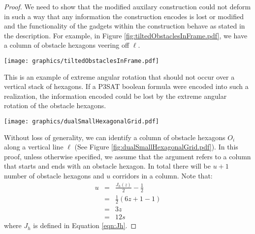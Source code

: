 \documentclass[10pt]{CSUNthesis}
\theoremstyle{plain}%
\theoremstyle{definition}
\theoremstyle{remark}
\newcommand{\lr}[1]{\left( #1 \right)}
\begin{document}
\begin{proof}
We need to show that the modified auxilary construction could not deform in such a way that any information the construction encodes is lost or modified and the functionality of the gadgets within the construction behave as stated in the description. 
For example, in Figure \ref{fig:tiltedObstaclesInFrame.pdf}, we have a column of obstacle hexagons veering off $\ell$.

\begin{minipage}{\linewidth}
\begin{center}
\texttt{[image: graphics/tiltedObstaclesInFrame.pdf]}
\label{fig:tiltedObstaclesInFrame.pdf}
\end{center}
\end{minipage}

This is an example of extreme angular rotation that should not occur over a vertical stack of hexagons. 
If a P3SAT boolean formula were encoded into such a realization, the information encoded could be lost by the extreme angular rotation of the obstacle hexagons.

\begin{minipage}{\linewidth}
\begin{center}
\texttt{[image: graphics/dualSmallHexagonalGrid.pdf]}
\label{fig:dualSmallHexagonalGrid.pdf}
\end{center}
\end{minipage}

Without loss of generality, we can identify a column of obstacle hexagons $O_i$ along a vertical line $\ell$ (See Figure \ref{fig:dualSmallHexagonalGrid.pdf}).
In this proof, unless otherwise specified, we assume that the argument refers to a column that starts and ends with an obstacle hexagon.  
In total there will be $u+1$ number of obstacle hexagons and $u$ corridors in a column.
Note that:
$$\begin{array}{rcl}
u&=& \frac{J_h (z)}{2} - \frac{1}{2}\\
&=& \frac{1}{2}\lr{6z + 1 - 1}\\
&=& 3z\\
&=& 12s
\end{array}$$
where $J_h$ is defined in Equation \ref{eqn:Jh}.


\end{proof}
\end{document}
